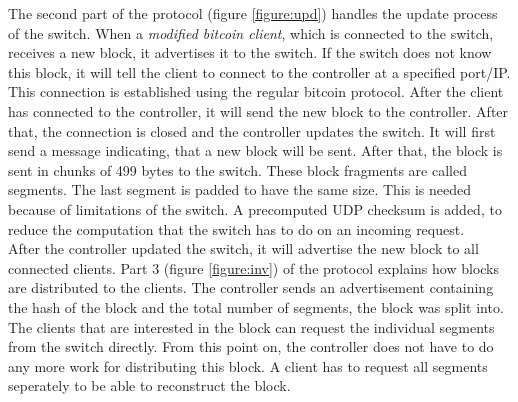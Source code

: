 The second part of the protocol (figure \ref{figure:upd}) handles the update process of the switch. When a \textit{modified bitcoin client}, which is connected to the switch, receives a new block, it advertises it to the switch. If the switch does not know this block, it will tell the client to connect to the controller at a specified port/IP. This connection is established using the regular bitcoin protocol. After the client has connected to the controller, it will send the new block to the controller. After that, the connection is closed and the controller updates the switch. It will first send a message indicating, that a new block will be sent. After that, the block is sent in chunks of 499 bytes to the switch. These block fragments are called segments. The last segment is padded to have the same size. This is needed because of limitations of the switch. A precomputed UDP checksum is added, to reduce the computation that the switch has to do on an incoming request.\\
After the controller updated the switch, it will advertise the new block to all connected clients. Part 3 (figure \ref{figure:inv}) of the protocol explains how blocks are distributed to the clients. The controller sends an advertisement containing the hash of the block and the total number of segments, the block was split into. The clients that are interested in the block can request the individual segments from the switch directly. From this point on, the controller does not have to do any more work for distributing this block. A client has to request all segments seperately to be able to reconstruct the block.


